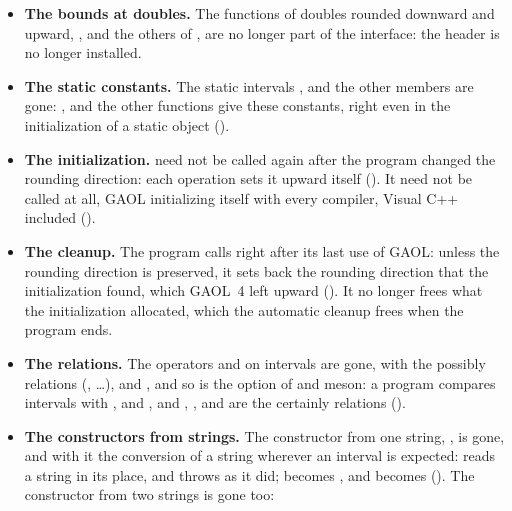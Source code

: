 \documentclass[12pt,a4paper,twoside,openright]{book}
\begin{document}
\begin{itemize}
   in .
\item[$\bullet$] \textbf{The bounds at doubles.} The functions of doubles
  rounded downward and upward, ,  and the
  others of , are no longer part of the
  interface: the header is no longer installed.
\item[$\bullet$] \textbf{The static constants.} The static intervals
  ,  and the other 
  members are gone: ,  and the
  other functions give these constants, right even in the initialization of a
  static object ().
\item[$\bullet$] \textbf{The initialization.}  need not be
  called again after the program changed the rounding direction: each
  operation sets it upward itself (). It need
  not be called at all, GAOL initializing itself with every compiler, Visual
  C++ included ().
\item[$\bullet$] \textbf{The cleanup.} The program calls
   right after its last use of GAOL: unless the
  rounding direction is preserved, it sets back the rounding direction that
  the initialization found, which GAOL~4 left upward (). It
  no longer frees what the initialization allocated, which the automatic
  cleanup frees when the program ends.
\item[$\bullet$] \textbf{The relations.} The operators \code{==} and
  \code{!=} on intervals are gone, with the possibly relations
  (, \ldots),
   and , and so is the option
   of  and meson: a program compares
  intervals with ,  and
  , and \code{<}, \code{<=}, \code{>} and \code{>=}
  are the certainly relations ().
\item[$\bullet$] \textbf{The constructors from strings.} The constructor from
  one string, , is gone, and with it the
  conversion of a string wherever an interval is expected:
   reads a string in its place, and throws as it
  did;  becomes , and
   becomes 
  (). The constructor from two strings is gone too:

\end{itemize}
\end{document}

